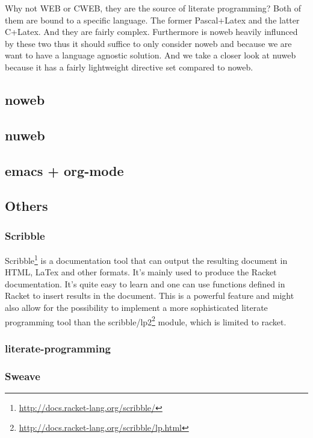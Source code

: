 \documentclass[11pt]{article}
\begin{document}
Why not WEB or CWEB, they are the source of literate programming? Both of
them are bound to a specific language. The former Pascal+Latex and the latter
C+Latex. And they are fairly complex. Furthermore is noweb heavily influnced
by these two thus it should suffice to only consider noweb and because we are
want to have a language agnostic solution. And we take a closer look at nuweb
because it has a fairly lightweight directive set compared to noweb.

\subsection{noweb}
\label{sec:orgheadline5}
\subsection{nuweb}
\label{sec:orgheadline6}
\subsection{emacs + org-mode}
\label{sec:orgheadline7}
\subsection{Others}
\label{sec:orgheadline11}
\subsubsection{Scribble}
\label{sec:orgheadline8}
Scribble\footnote{\url{http://docs.racket-lang.org/scribble/}} is a documentation tool that can output the resulting document
in HTML, LaTex and other formats. It's mainly used to produce the Racket
documentation. It's quite easy to learn and one can use functions defined
in Racket to insert results in the document. This is a powerful feature
and might also allow for the possibility to implement a more sophisticated
literate programming tool than the scribble/lp2\footnote{\url{http://docs.racket-lang.org/scribble/lp.html}} module, which is limited to 
racket.
\subsubsection{literate-programming}
\label{sec:orgheadline9}
\subsubsection{Sweave}
\label{sec:orgheadline10}
\end{document}
